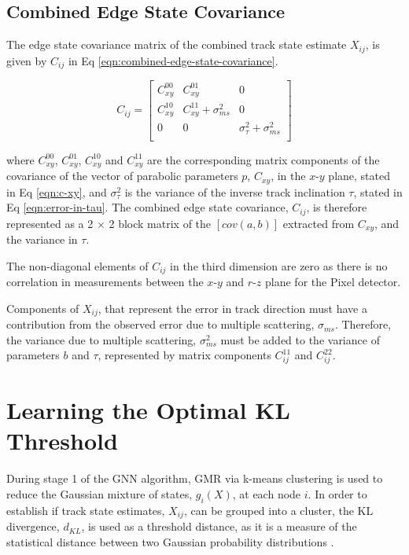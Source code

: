 \subsection{Combined Edge State Covariance}

The edge state covariance matrix of the combined track state estimate $X_{ij}$, is given by $C_{ij}$ in Eq \eqref{eqn:combined-edge-state-covariance}.

\begin{equation}
    C_{ij} = \begin{bmatrix} 
            C_{xy}^{00} & C_{xy}^{01} & 0 \\ 
            C_{xy}^{10} & C_{xy}^{11} + \sigma_{ms}^2 & 0 \\ 
            0 & 0 & \sigma_{\tau}^{2} + \sigma_{ms}^2 \\
            \end{bmatrix} 
    \label{eqn:combined-edge-state-covariance}
\end{equation}

where $C_{xy}^{00}$, $C_{xy}^{01}$, $C_{xy}^{10}$ and $C_{xy}^{11}$ are the corresponding matrix components of the covariance of the vector of parabolic parameters $p$, $C_{xy}$, in the $x$-$y$ plane, stated in Eq \eqref{eqn:c-xy}, and $\sigma_{\tau}^2$ is the variance of the inverse track inclination $\tau$, stated in Eq \eqref{eqn:error-in-tau}. The combined edge state covariance, $C_{ij}$, is therefore represented as a 2 $\times$ 2 block matrix of the $[cov(a, b)]$ extracted from $C_{xy}$, and the variance in $\tau$.

The non-diagonal elements of $C_{ij}$ in the third dimension are zero as there is no correlation in measurements between the $x$-$y$ and $r$-$z$ plane for the Pixel detector.

Components of $X_{ij}$, that represent the error in track direction must have a contribution from the observed error due to multiple scattering, $\sigma_{ms}$. Therefore, the variance due to multiple scattering, $\sigma_{ms}^2$ must be added to the variance of parameters $b$ and $\tau$, represented by matrix components $C_{ij}^{11}$ and $C_{ij}^{22}$.




\section{Learning the Optimal KL Threshold}
\label{chapter-6-kl-threshold}

During stage 1 of the GNN algorithm, GMR via k-means clustering is used to reduce the Gaussian mixture of states, $g_i(X)$, at each node $i$. In order to establish if track state estimates, $X_{ij}$, can be grouped into a cluster, the KL divergence, $d_{KL}$, is used as a threshold distance, as it is a measure of the statistical distance between two Gaussian probability distributions \cite{KL, FRUHWIRTH19971}.

